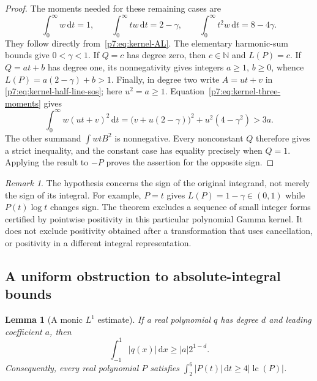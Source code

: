 \documentclass[11pt,a4paper]{article}
\newtheorem{lemma}[theorem]{Lemma}
\theoremstyle{definition}
\theoremstyle{remark}
\newtheorem{remark}[theorem]{Remark}
\newcommand{\N}{\mathbb N}
\newcommand{\dd}{\,\mathrm d}
\DeclareMathOperator{\lc}{lc}
\numberwithin{equation}{section}
\begin{document}
\begin{proof}
The moments needed for these remaining cases are
\begin{equation}\label{p7:eq:kernel-three-moments}
 \int_0^\infty w\dd t=1,\qquad
 \int_0^\infty tw\dd t=2-\gamma,\qquad
 \int_0^\infty t^2w\dd t=8-4\gamma.
\end{equation}
They follow directly from~\eqref{p7:eq:kernel-AL}.
The elementary harmonic-sum bounds give $0<\gamma<1$.
If $Q=c$ has degree zero, then $c\in\N$ and $L(P)=c$.
If $Q=at+b$ has degree one, its nonnegativity gives integers
$a\geq1$, $b\geq0$, whence $L(P)=a(2-\gamma)+b>1$.
Finally, in degree two write $A=ut+v$ in
\eqref{p7:eq:kernel-half-line-sos}; here $u^2=a\geq1$.
Equation~\eqref{p7:eq:kernel-three-moments} gives
\[
 \int_0^\infty w(ut+v)^2\dd t
 =\bigl(v+u(2-\gamma)\bigr)^2+u^2(4-\gamma^2)>3a.
\]
The other summand $\int wtB^2$ is nonnegative.
Every nonconstant $Q$ therefore gives a strict inequality, and the
constant case has equality precisely when $Q=1$.
Applying the result to $-P$ proves the assertion for the opposite sign.
\end{proof}

\begin{remark}\label{p7:rem:kernel-positive-scope}
The hypothesis concerns the sign of the original integrand, not merely
the sign of its integral.  For example, $P=t$ gives
$L(P)=1-\gamma\in(0,1)$ while $P(t)\log t$ changes sign.
The theorem excludes a sequence of small integer forms certified by
pointwise positivity in this particular polynomial Gamma kernel.
It does not exclude positivity obtained after a transformation that
uses cancellation, or positivity in a different integral representation.
\end{remark}

\subsection{A uniform obstruction to absolute-integral bounds}

\begin{lemma}[A monic $L^1$ estimate]\label{p7:lem:kernel-chebyshev-L1}
If a real polynomial $q$ has degree $d$ and leading coefficient $a$,
then
\[
 \int_{-1}^1|q(x)|\dd x\geq |a|2^{1-d}.
\]
Consequently, every real polynomial $P$ satisfies
$\int_2^6|P(t)|\dd t\geq4|\lc(P)|$.
\end{lemma}
\end{document}
